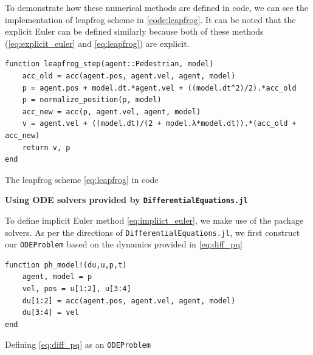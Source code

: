 To demonstrate how these numerical methods are defined in code, we can see the implementation of leapfrog scheme in \autoref{code:leapfrog}. It can be noted that the explicit Euler can be defined similarly because both of these methods (\autoref{eq:explicit_euler} and \autoref{eq:leapfrog}) are explicit.

\begin{listing}[H]
\begin{verbatim}    
function leapfrog_step(agent::Pedestrian, model)
    acc_old = acc(agent.pos, agent.vel, agent, model)
    p = agent.pos + model.dt.*agent.vel + ((model.dt^2)/2).*acc_old
    p = normalize_position(p, model)
    acc_new = acc(p, agent.vel, agent, model)
    v = agent.vel + ((model.dt)/(2 + model.λ*model.dt)).*(acc_old + acc_new)
    return v, p
end 
\end{verbatim}
\caption{The leapfrog scheme \autoref{eq:leapfrog} in code}
\label{code:leapfrog}
\end{listing}

\textbf{Using ODE solvers provided by \texttt{DifferentialEquations.jl}}

To define implicit Euler method \autoref{eq:impliict_euler}, we make use of the package solvers. As per the directions of \texttt{DifferentialEquations.jl}, we first construct our \texttt{ODEProblem} based on the dynamics provided in \autoref{eq:diff_pq}
\begin{listing}[H]
\begin{verbatim}    
function ph_model!(du,u,p,t)
    agent, model = p
    vel, pos = u[1:2], u[3:4]
    du[1:2] = acc(agent.pos, agent.vel, agent, model)
    du[3:4] = vel
end
\end{verbatim}
\caption{Defining \autoref{eq:diff_pq} as an \texttt{ODEProblem}}
\label{code:ph_prob}
\end{listing}

